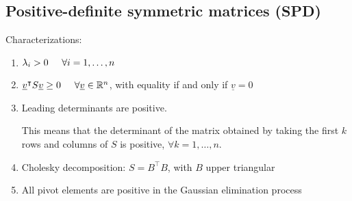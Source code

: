 \subsection{Positive-definite symmetric matrices (SPD)}
Characterizations:
\begin{enumerate}[i]
    \item $\lambda_i > 0 \hspace{0.5cm} \forall i = 1, \dots, n$
    \item $\underline{v}^\intercal S \underline{v} \geq 0 \hspace{0.5cm} \forall \underline{v} \in \mathbb{R}^n$, with equality if and only if $\underline{v} = 0$
    \item Leading determinants are positive. \\
    \begin{multicols}{2}
        \begin{center}
        \end{center}

        This means that the determinant of the matrix obtained by taking the first $k$ rows and columns of $S$ is positive, $\forall k = 1, \dots, n$.
    \end{multicols}

    \item Cholesky decomposition: $S = B^\intercal B$, with $B$ upper triangular
    \item All pivot elements are positive in the Gaussian elimination process
\end{enumerate}

